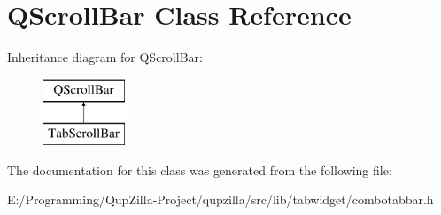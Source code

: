 \hypertarget{class_q_scroll_bar}{
\section{QScrollBar Class Reference}
\label{class_q_scroll_bar}
}
Inheritance diagram for QScrollBar:\begin{figure}[H]
\begin{center}
\leavevmode
\includegraphics[height=2cm]{class_q_scroll_bar}
\end{center}
\end{figure}


The documentation for this class was generated from the following file:\begin{DoxyCompactItemize}
\item 
E:/Programming/QupZilla-\/Project/qupzilla/src/lib/tabwidget/combotabbar.h\end{DoxyCompactItemize}
